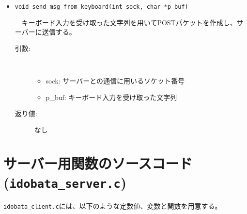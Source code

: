\documentclass[uplatex,dvipdfmx,11pt,a4paper]{jsarticle} %
\begin{document}
\begin{itemize}

    \item {\tt void send\_msg\_from\_keyboard(int sock, char *p\_buf)}

        　キーボード入力を受け取った文字列を用いてPOSTパケットを作成し、サーバーに送信する。
        \begin{description}
            \item[引数:] \ 

                \begin{itemize}
                        \item sock: サーバーとの通信に用いるソケット番号
                        \item p\_buf: キーボード入力を受け取った文字列
                \end{itemize}
            \item[返り値:] なし
        \end{description}
\end{itemize}

\section{サーバー用関数のソースコード({\tt idobata\_server.c})}
{\tt idobata\_client.c}には、以下のような定数値、変数と関数を用意する。

 
\end{document}
